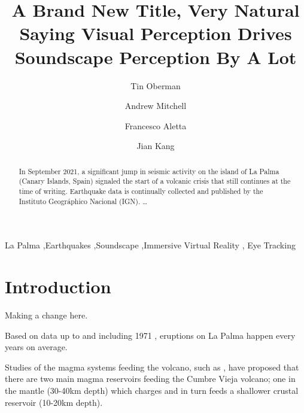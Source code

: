 \documentclass[
  authoryear,
  3p]{elsarticle}
\begin{document}
\begin{frontmatter}
\title{A Brand New Title, Very Natural Saying Visual Perception Drives
Soundscape Perception By A Lot}
\author[1]{Tin Oberman%
%
}
\author[1]{Andrew Mitchell%
%
}

\author[1]{Francesco Aletta%
%
}

\author[1]{Jian Kang%
%
}







        
\begin{abstract}
In September 2021, a significant jump in seismic activity on the island
of La Palma (Canary Islands, Spain) signaled the start of a volcanic
crisis that still continues at the time of writing. Earthquake data is
continually collected and published by the Instituto Geográphico
Nacional (IGN). \ldots{}
\end{abstract}





\begin{keyword}
    La Palma \sep Earthquakes \sep Soundscape \sep Immersive Virtual
Reality \sep 
    Eye Tracking
\end{keyword}
\end{frontmatter}
    


\section{Introduction}\label{introduction}

Making a change here.

Based on data up to and including 1971 \textcite{Mitchell2022How},
eruptions on La Palma happen every years on average.

Studies of the magma systems feeding the volcano, such as
\textcite{marrero2019}, have proposed that there are two main magma
reservoirs feeding the Cumbre Vieja volcano; one in the mantle (30-40km
depth) which charges and in turn feeds a shallower crustal reservoir
(10-20km depth).
\end{document}
